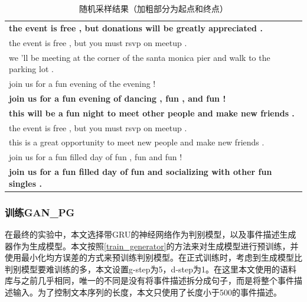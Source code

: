 \begin{table}[htbp]
    \center
    \caption{\label{t3-3}随机采样结果（加粗部分为起点和终点）}
    \begin{tabular*}{\linewidth}{p{\linewidth}}
\toprule
\textbf{the event is free , but donations will be greatly appreciated .}\\
the event is free , but you must rsvp on meetup . \\
we 'll be meeting at the corner of the santa monica pier and walk to the parking lot .\\
join us for a fun evening of the evening !\\
\textbf{join us for a fun evening of dancing , fun , and fun !}\\
\midrule
\textbf{this will be a fun night to meet other people and make new friends .}\\
the event is free , but you must rsvp on meetup . \\
this is a great opportunity to meet new people and make new friends .\\
join us for a fun filled day of fun , fun and fun ! \\
\textbf{join us for a fun filled day of fun and socializing with other fun singles . }\\
\bottomrule
    \end{tabular*}
\end{table}

\subsubsection{训练GAN\_PG}
在最终的实验中，本文选择带GRU的神经网络作为判别模型，以及事件描述生成器作为生成模型。本文按照\ref{train_generator}的方法来对生成模型进行预训练，并使用最小化均方误差的方式来预训练判别模型。在正式训练时，考虑到生成模型比判别模型要难训练的多，本文设置g-step为5，d-step为1。在这里本文使用的语料库与之前几乎相同，唯一的不同是没有将事件描述拆分成句子，而是将整个事件描述输入。为了控制文本序列的长度，本文只使用了长度小于500的事件描述。
